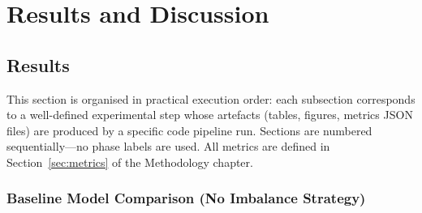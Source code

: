 \chapter{Results and Discussion}
\label{sec:chapterResults}




\section{Results}
\label{sec:results}

This section is organised in practical execution order:
each subsection corresponds to a well-defined experimental step whose artefacts (tables, figures, metrics JSON files) are produced by a specific code pipeline run.
Sections are numbered sequentially—no phase labels are used.
All metrics are defined in Section~\ref{sec:metrics} of the Methodology chapter.


\subsection{Baseline Model Comparison (No Imbalance Strategy)}
\label{sec:baseline_results}

